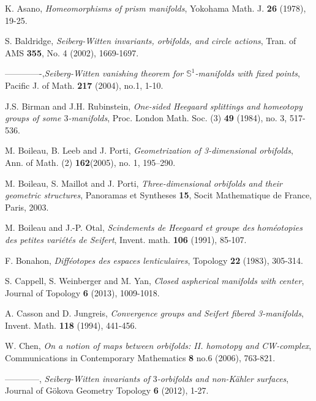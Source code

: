 \documentclass[11pt]{amsart}
\theoremstyle{plain}
\numberwithin{theorem}{section}
\theoremstyle{definition}
\begin{document}
\begin{thebibliography}{}

 K.  Asano, {\em Homeomorphisms of prism manifolds}, 
Yokohama Math. J. {\bf 26} (1978), 19-25. 

 S. Baldridge, {\em Seiberg-Witten invariants, orbifolds, and
                 circle actions}, Tran. of AMS {\bf 355}, No. 4 (2002), 
               1669-1697.

 -------------,{\em Seiberg-Witten vanishing theorem 
               for ${{\mathbb S}}^1$-manifolds with fixed points}, 
               Pacific J. of Math. {\bf 217} (2004), no.1, 1-10.
               
 J.S. Birman and J.H. Rubinstein, {\em One-sided Heegaard splittings and homeotopy 
groups of some $3$-manifolds}, Proc. London Math. Soc. (3) {\bf 49}  (1984), no. 3, 517-536. 
               
 M. Boileau, B. Leeb and J. Porti, {\em Geometrization 
of 3-dimensional orbifolds}, Ann. of Math. (2) {\bf 162}(2005),  no. 1, 195--290.

 M. Boileau, S. Maillot and J. Porti, {\em Three-dimensional 
orbifolds and their geometric structures}, Panoramas et Syntheses {\bf 15}, 
Socit Mathematique de France, Paris, 2003.

 M. Boileau and J.-P. Otal, {\em Scindements de Heegaard et groupe des hom\'{e}otopies
des petites vari\'{e}t\'{e}s de Seifert}, Invent. math. {\bf 106} (1991), 85-107. 

 F. Bonahon, {\em Diff\'{e}otopes des espaces lenticulaires},
                          Topology {\bf 22} (1983), 305-314. 
                          
 S. Cappell, S. Weinberger and M. Yan, {\em Closed aspherical manifolds with
center}, Journal of Topology {\bf 6} (2013), 1009-1018.                          

 A. Casson and D. Jungreis, {\em Convergence groups and Seifert fibered 3-manifolds}, 
     Invent. Math. {\bf 118} (1994), 441-456.
     
 W. Chen, {\em On a notion of maps between orbifolds:
             II. homotopy and CW-complex}, Communications in
             Contemporary Mathematics {\bf 8} no.6 (2006), 763-821. 
    
 ------------, {\em Seiberg-Witten invariants of $3$-orbifolds and non-K\"{a}hler surfaces}, 
Journal of G\"{o}kova Geometry Topology {\bf 6} (2012), 1-27.


\end{thebibliography}
\end{document}
